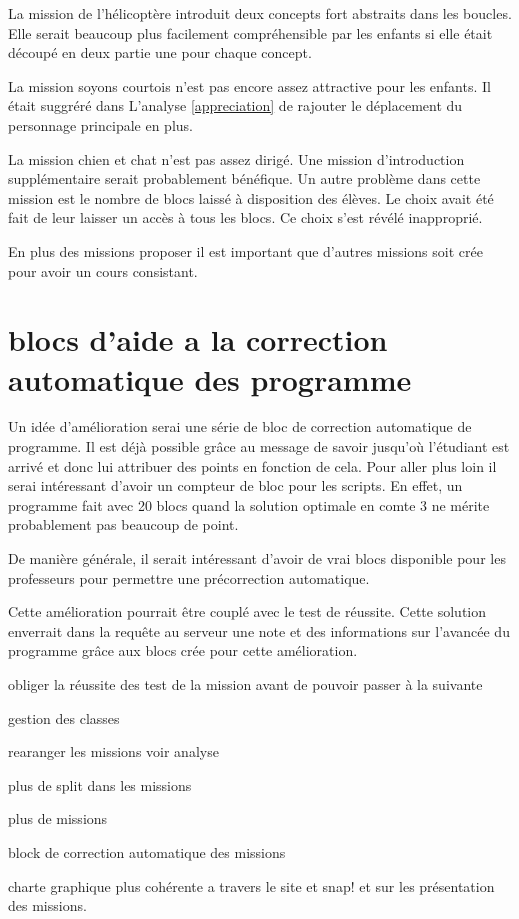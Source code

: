 La mission de l'hélicoptère introduit deux concepts fort abstraits dans les boucles. Elle serait beaucoup plus facilement compréhensible par les enfants si elle était découpé en deux partie une pour chaque concept.

La mission soyons courtois n'est pas encore assez attractive pour les enfants. Il était suggréré dans L'analyse \ref{appreciation} de rajouter le déplacement du personnage principale en plus.

La mission chien et chat n'est pas assez dirigé. Une mission d'introduction supplémentaire serait probablement bénéfique. Un autre problème dans cette mission est le nombre de blocs laissé à disposition des élèves. Le choix avait été fait de leur laisser un accès à tous les blocs. Ce choix s'est révélé inapproprié.

En plus des missions proposer il est important que d'autres missions soit crée pour avoir un cours consistant.

\section{blocs d'aide a la correction automatique des programme}
Un idée d'amélioration serai une série de bloc de correction automatique de programme. Il est déjà possible grâce au message de savoir jusqu'où l'étudiant est arrivé et donc lui attribuer des points en fonction de cela. Pour aller plus loin il serai intéressant d'avoir un compteur de bloc pour les scripts. En effet, un programme fait avec 20 blocs quand la solution optimale en comte 3 ne mérite probablement pas beaucoup de point.

De manière générale, il serait intéressant d'avoir de vrai blocs disponible pour les professeurs pour permettre une précorrection automatique.

Cette amélioration pourrait être couplé avec le test de réussite. Cette solution enverrait dans la requête au serveur une note et des informations sur l'avancée du programme grâce aux blocs crée pour cette amélioration.



obliger la réussite des test de la mission avant de pouvoir passer à la suivante

gestion des classes

rearanger les missions voir analyse

plus de split dans les missions

plus de missions

block de correction automatique des missions

charte graphique plus cohérente a travers le site et snap! et sur les présentation des missions.
